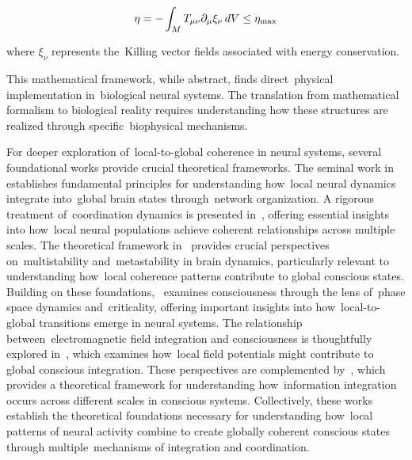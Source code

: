 \begin{equation}
  \eta = -\int_M T_{\mu\nu}\partial_\mu\xi_\nu \,dV \leq \eta_{\text{max}}
  \myequation{Thermodynamic efficiency constraint for consciousness}
  \label{eq:thermodynamic_efficiency}
\end{equation}

where $\xi_\nu$ represents the~Killing vector fields associated with energy conservation.

This mathematical framework, while abstract, finds direct~physical implementation in~biological neural systems. The translation from mathematical formalism to biological reality requires understanding how these structures are realized through specific~biophysical mechanisms.

For deeper exploration of~local-to-global coherence in neural systems, several foundational works provide crucial theoretical frameworks. The seminal work in~\cite{Sporns2011} establishes fundamental principles for understanding how~local neural dynamics integrate into~global brain states through~network organization. A rigorous treatment of~coordination dynamics is presented in~\cite{Bressler2016}, offering essential insights into how~local neural populations achieve coherent relationships across multiple scales. The theoretical framework in~\cite{kelso2012} provides crucial perspectives on~multistability and~metastability in brain dynamics, particularly relevant to understanding how~local coherence patterns contribute to global conscious states. Building on these foundations,~\cite{Werner2013} examines consciousness through the lens of~phase space dynamics and~criticality, offering important insights into how~local-to-global transitions emerge in neural systems. The relationship between~electromagnetic field integration and consciousness is thoughtfully explored in~\cite{mcfadden2020integrating}, which examines how~local field potentials might contribute to global conscious integration. These perspectives are complemented by~\cite{Tononi2015}, which provides a theoretical framework for understanding how~information integration occurs across different scales in conscious systems. Collectively, these works establish the theoretical foundations necessary for understanding how~local patterns of neural activity combine to create globally coherent conscious states through multiple~mechanisms of integration and coordination.

